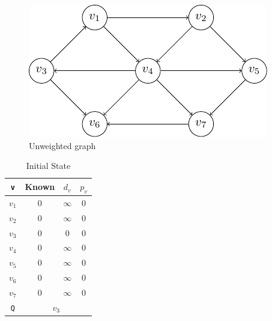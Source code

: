 \begin{minipage}{0.33\textwidth}
  \begin{figure}[H]
    \centering
    \includegraphics[width=\textwidth]{Figure/unweighted_path.pdf}
    \caption{Unweighted graph}
  \end{figure}
\end{minipage}
\begin{minipage}{0.33\textwidth}
\begin{table}[H]
  \centering
  \begin{tabular}{c|c|c|c}
      \toprule
      \verb|v| & Known & \(d_v\) & \(p_v\)  \\
    \midrule
      \(v_1\) & 0 & \(\infty\) & 0  \\
      \(v_2\) & 0 & \(\infty\) & 0  \\
      \(v_3\) & 0 & \(0\) & 0  \\
      \(v_4\) & 0 & \(\infty\) & 0  \\
      \(v_5\) & 0 & \(\infty\) & 0  \\
      \(v_6\) & 0 & \(\infty\) & 0  \\
      \(v_7\) & 0 & \(\infty\) & 0  \\
    \midrule
      \verb|Q| & \multicolumn{3}{c}{\(v_3\)} \\
    \bottomrule
  \end{tabular}
  \caption*{Initial State}
\end{table}
\end{minipage}
